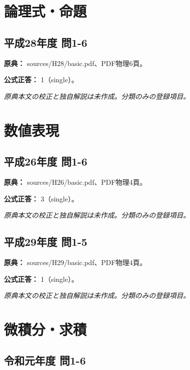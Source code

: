 \section{論理式・命題}

\subsection{平成28年度 問1-6}
\label{q:h28-reg-basic-1-6}

\noindent\textbf{原典：} sources/H28/basic.pdf、PDF物理6頁。

\textbf{公式正答：} 1（single）。

\par\textit{原典本文の校正と独自解説は未作成。分類のみの登録項目。}

\section{数値表現}

\subsection{平成26年度 問1-6}
\label{q:h26-reg-basic-1-6}

\noindent\textbf{原典：} sources/H26/basic.pdf、PDF物理4頁。

\textbf{公式正答：} 3（single）。

\par\textit{原典本文の校正と独自解説は未作成。分類のみの登録項目。}

\subsection{平成29年度 問1-5}
\label{q:h29-reg-basic-1-5}

\noindent\textbf{原典：} sources/H29/basic.pdf、PDF物理4頁。

\textbf{公式正答：} 1（single）。

\par\textit{原典本文の校正と独自解説は未作成。分類のみの登録項目。}

\section{微積分・求積}

\subsection{令和元年度 問1-6}
\label{q:r01-reg-basic-1-6}

